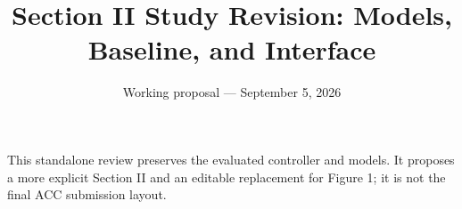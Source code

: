 \documentclass[letterpaper,10pt,conference]{IEEEtran}
\begin{document}
\title{Section II Study Revision: Models, Baseline, and Interface}
\author{Working proposal --- September 5, 2026}
\maketitle
\noindent This standalone review preserves the evaluated controller and
models. It proposes a more explicit Section II and an editable replacement
for Figure 1; it is not the final ACC submission layout.
\setcounter{section}{1}

\label{sec:architecture}


\end{document}
